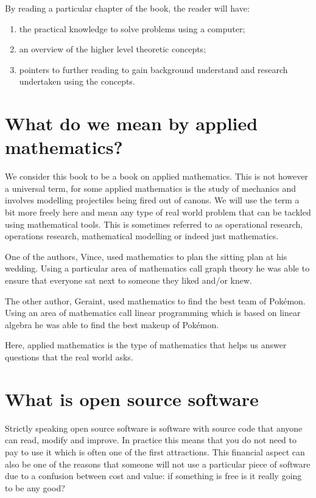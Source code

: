By reading a particular chapter of the book, the reader will have:

\begin{enumerate}
  \item the practical knowledge to solve problems using a computer;
  \item an overview of the higher level theoretic concepts;
  \item pointers to further reading to gain background understand and research
        undertaken using the concepts.
\end{enumerate}

\section{What do we mean by applied mathematics?}\label{sec:what-do-we-mean-by-applied-mathematics}

We consider this book to be a book on applied mathematics. This is not
however a universal term, for some applied mathematics is the study of
mechanics and involves modelling projectiles being fired out of canons.
We will use the term a bit more freely here and mean any type of real
world problem that can be tackled using mathematical tools. This is
sometimes referred to as operational research, operations research,
mathematical modelling or indeed just mathematics.

One of the authors, Vince, used mathematics to plan the sitting plan at
his wedding. Using a particular area of mathematics call graph theory he
was able to ensure that everyone sat next to someone they liked and/or
knew.

The other author, Geraint, used mathematics to find the best team of
Pokémon. Using an area of mathematics call linear programming which is
based on linear algebra he was able to find the best makeup of Pokémon.

Here, applied mathematics is the type of mathematics that helps us
answer questions that the real world asks.

\section{What is open source software}
\label{sec:what-is-open-source-software}

Strictly speaking open source software is software with source code that
anyone can read, modify and improve. In practice this means that you do
not need to pay to use it which is often one of the first attractions.
This financial aspect can also be one of the reasons that someone will
not use a particular piece of software due to a confusion between cost
and value: if something is free is it really going to be any good?

